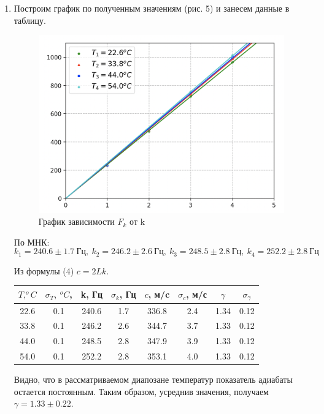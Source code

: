 \documentclass[12pt,a4paper]{article}
\begin{document}
\begin{enumerate}
\item Построим график по полученным значениям (рис. 5) и занесем данные в таблицу.
\begin{figure}[h!]
    \centering
    \includegraphics[width=0.65\linewidth]{airT.png}
    \caption{График зависимости $F_k$ от k}
    \label{fig:my_label}
\end{figure}

По МНК:
\begin{equation*}
    k_1 = 240.6\pm 1.7\ Гц,\ k_2 = 246.2\pm2.6\ Гц,\ k_3 = 248.5\pm 2.8\ Гц,\ k_4 = 252.2\pm 2.8\ Гц
\end{equation*}

Из формулы (4) $c = 2Lk$.


\begin{table}[ht!]
\begin{center}
\begin{tabular}{|c|c|c|c|c|c|c|c|}
\hline
$T, ^oC$ & $\sigma_T,\ ^oC$, & k, Гц & $\sigma_k$, Гц & $c$, м/c & $\sigma_c$, м/с & $\gamma$ & $\sigma_\gamma$ \\ \hline
22.6     & 0.1               & 240.6 & 1.7            & 336.8    & 2.4             & 1.34     & 0.12            \\ \hline
33.8     & 0.1               & 246.2 & 2.6            & 344.7    & 3.7             & 1.33     & 0.12            \\ \hline
44.0     & 0.1               & 248.5 & 2.8            & 347.9    & 3.9             & 1.33     & 0.12            \\ \hline
54.0     & 0.1               & 252.2 & 2.8            & 353.1    & 4.0             & 1.33     & 0.12            \\ \hline
\end{tabular}
\end{center}
\end{table}

Видно, что в рассматриваемом диапозане температур показатель адиабаты остается постоянным. Таким образом, усреднив значения, получаем $\gamma = 1.33\pm0.22$.
\end{enumerate}
\end{document}
